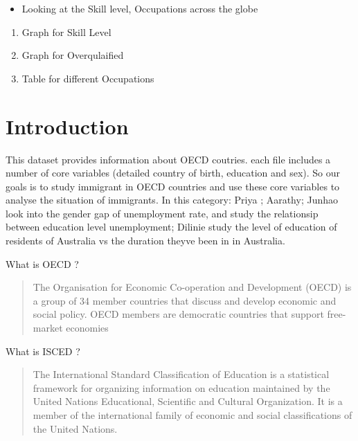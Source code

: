 \documentclass[11pt,a4paper,]{article}
\providecommand{\tightlist}{%
  \setlength{\itemsep}{0pt}\setlength{\parskip}{0pt}}
\begin{document}
\begin{itemize}
\tightlist
\item
  Looking at the Skill level, Occupations across the globe
\end{itemize}

\begin{enumerate}
   \item Graph for Skill Level
   \item Graph for Overqulaified 
   \item Table for different Occupations
 \end{enumerate}

\section*{Introduction}

This dataset provides information about OECD coutries. each file includes a number of core variables (detailed country of birth, education and sex). So our goals is to study immigrant in OECD countries and use these core variables to analyse the situation of immigrants. In this category: Priya ; Aarathy; Junhao look into the gender gap of unemployment rate, and study the relationsip between education level unemployment; Dilinie study the level of education of residents of Australia vs the duration theyve been in in Australia.

What is OECD ?

\begin{quote}
The Organisation for Economic Co-operation and Development (OECD) is a group of 34 member countries that discuss and develop economic and social policy. OECD members are democratic countries that support free-market economies
\end{quote}

What is ISCED ?

\begin{quote}
The International Standard Classification of Education is a statistical framework for organizing information on education maintained by the United Nations Educational, Scientific and Cultural Organization. It is a member of the international family of economic and social classifications of the United Nations.
\end{quote}
\end{document}
